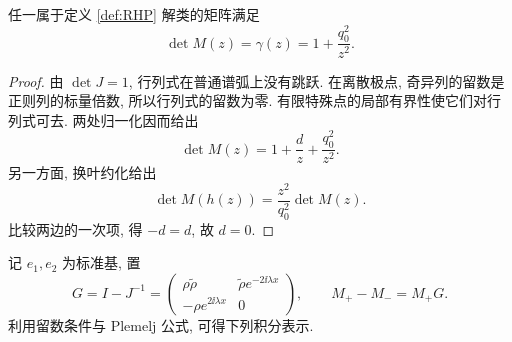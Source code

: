 \begin{lemma}\label{lem:RHP-determinant}
任一属于定义 \ref{def:RHP} 解类的矩阵满足
\begin{equation}\label{eq:detM}
\det M(z)=\gamma(z)=1+\dfrac{q_0^2}{z^2}.
\end{equation}
\end{lemma}
\begin{proof}
由 $\det J=1$, 行列式在普通谱弧上没有跳跃.
在离散极点, 奇异列的留数是正则列的标量倍数, 所以行列式的留数为零.
有限特殊点的局部有界性使它们对行列式可去.
两处归一化因而给出
\begin{equation*}
\det M(z)=1+\dfrac{d}{z}+\dfrac{q_0^2}{z^2}.
\end{equation*}
另一方面, 换叶约化给出
\begin{equation*}
\det M(h(z))=\dfrac{z^2}{q_0^2}\det M(z).
\end{equation*}
比较两边的一次项, 得 $-d=d$, 故 $d=0$.
\end{proof}
记 $e_1,e_2$ 为标准基, 置
\begin{equation}\label{eq:Gdefinition}
G=I-J^{-1}=\begin{pmatrix}
\rho\widetilde\rho&\widetilde\rho e^{-2\ii\lambda x}\\
-\rho e^{2\ii\lambda x}&0
\end{pmatrix},\qquad M_+-M_-=M_+G.
\end{equation}
利用留数条件与 Plemelj 公式\cite{ZhangFan2020,Fan2022}, 可得下列积分表示.

